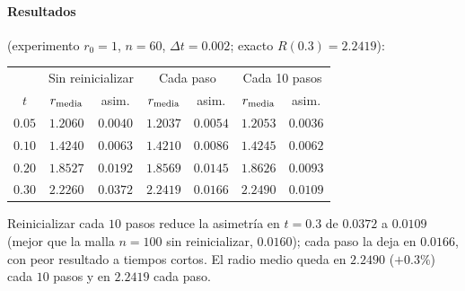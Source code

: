 \paragraph{Resultados} (experimento $r_0=1$, $n=60$, $\Delta t=0.002$; exacto $R(0.3)=2.2419$):
\begin{center}
\begin{tabular}{c|cc|cc|cc}
\toprule
 & \multicolumn{2}{c|}{Sin reinicializar} & \multicolumn{2}{c|}{Cada paso} & \multicolumn{2}{c}{Cada 10 pasos}\\
$t$ & $r_{\rm media}$ & asim. & $r_{\rm media}$ & asim. & $r_{\rm media}$ & asim.\\
\midrule
$0.05$ & $1.2060$ & $0.0040$ & $1.2037$ & $0.0054$ & $1.2053$ & $0.0036$\\
$0.10$ & $1.4240$ & $0.0063$ & $1.4210$ & $0.0086$ & $1.4245$ & $0.0062$\\
$0.20$ & $1.8527$ & $0.0192$ & $1.8569$ & $0.0145$ & $1.8626$ & $0.0093$\\
$0.30$ & $2.2260$ & $0.0372$ & $2.2419$ & $0.0166$ & $2.2490$ & $0.0109$\\
\bottomrule
\end{tabular}
\end{center}
Reinicializar cada $10$ pasos reduce la asimetría en $t=0.3$ de $0.0372$ a $0.0109$ (mejor que la malla $n=100$ sin reinicializar, $0.0160$); cada paso la deja en $0.0166$, con peor resultado a tiempos cortos. El radio medio queda en $2.2490$ ($+0.3\%$) cada $10$ pasos y en $2.2419$ cada paso.

